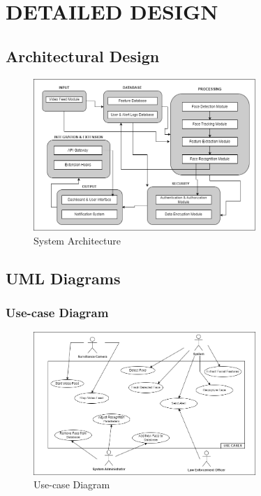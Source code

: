 \chapter{DETAILED DESIGN}

\section{Architectural Design}
	\begin{figure}[h!]
		\centering
		\includegraphics[width=0.75\textwidth]{components/images/sys-arch.png}
		\caption{System Architecture}
		\label{fig:sys-arch}
	\end{figure}

\section{UML Diagrams}
	\subsection{Use-case Diagram}
		\begin{figure}[h!]
			\centering
			\includegraphics[width=0.75\textwidth]{components/images/use-case.png}
			\caption{Use-case Diagram}
			\label{fig:use-case-rep}
		\end{figure}

